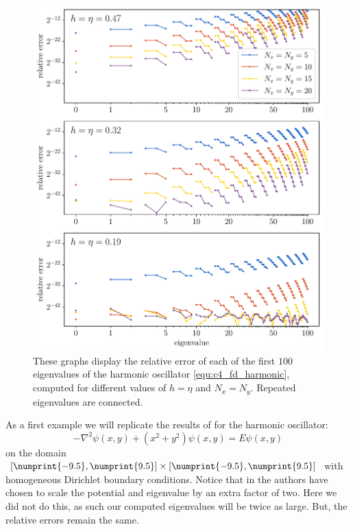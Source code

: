 \begin{figure}
    \begin{center}
        \includegraphics[width=\textwidth]{img/chapter4/fd_harmonic.pdf}
    \end{center}
    \caption{These graphs display the relative error of each of the first $100$ eigenvalues of the harmonic oscillator \eqref{equ:c4_fd_harmonic}, computed for different values of $h = \eta$ and $N_x = N_y$. Repeated eigenvalues are connected.}
    \label{fig:c4_fd_harmonic}
\end{figure}

As a first example we will replicate the results of \cite{wang_new_2009} for the harmonic oscillator:
\begin{equation}\label{equ:c4_fd_harmonic}
    -\nabla^2 \psi(x, y) + \left(x^2 + y^2\right) \psi(x, y) = E \psi(x, y)
\end{equation}
on the domain $[\numprint{-9.5}, \numprint{9.5}] \times [\numprint{-9.5}, \numprint{9.5}]$ with homogeneous Dirichlet boundary conditions. Notice that in \cite{wang_new_2009} the authors have chosen to scale the potential and eigenvalue by an extra factor of two. Here we did not do this, as such our computed eigenvalues will be twice as large. But, the relative errors remain the same.

